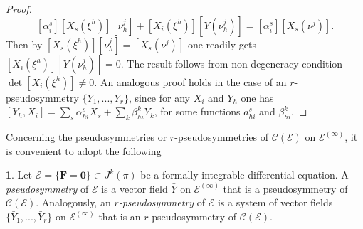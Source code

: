 \documentclass[12pt,english]{elsarticle}
\theoremstyle{plain}
\theoremstyle{plain}
\theoremstyle{remark}
\theoremstyle{plain}
\theoremstyle{definition}
\newtheorem{defn}[thm]{\protect\definitionname}
\theoremstyle{definition}
\providecommand{\definitionname}{Definition}
\begin{document}
\begin{proof}
\begin{equation*}
\left [\alpha _{i}^{s}\right ]\left [X_{s}(\xi ^{h})\right ]\left [
\nu _{h}^{j}\right ]+\left [X_{i}(\xi ^{h})\right ]\left [Y(\nu _{h}^{j})
\right ]=\left [\alpha _{i}^{s}\right ]\left [X_{s}(\nu ^{j})\right ].
\end{equation*}
%
Then by
$\left [X_{s}(\xi ^{h})\right ]\left [\nu _{h}^{j}\right ]=\left [X_{s}(
\nu ^{j})\right ]$ one readily gets
$\left [X_{i}(\xi ^{h})\right ]\left [Y(\nu _{h}^{j})\right ]=0$. The result
follows from non-degeneracy condition
$\det \left [X_{i}(\xi ^{h})\right ]\neq 0$. An analogous proof holds in
the case of an $r$-pseudosymmetry $\{Y_{1},...,Y_{r}\}$, since for any
$X_{i}$ and $Y_{h}$ one has
$[Y_{h},X_{i}]=\sum _{s}\alpha _{hi}^{s}X_{s}+\sum _{k}\beta _{hi}^{k}Y_{k}$,
for some functions $a_{hi}^{s}$ and $\beta _{hi}^{k}$.
\end{proof}
%


Concerning the pseudosymmetries or $r$-pseudosymmetries of
$\mathcal{\mathcal{C}}(\mathcal{E})$ on $\mathcal{E}^{(\infty )}$, it is
convenient to adopt the following
%
\begin{defn}
\label{defn10}
Let $\mathcal{E}=\{\mathbf{F=0}\}\subset J^{k}(\pi )$ be a formally integrable
differential equation. A \textit{pseudosymmetry} of $\mathcal{E}$ is a vector
field $\bar{Y}$ on $\mathcal{E}^{(\infty )}$ that is a pseudosymmetry of
$\mathcal{C}(\mathcal{E})$. Analogously, an \textit{$r$-pseudosymmetry}
of $\mathcal{E}$ is a system of vector fields
$\{\bar{Y}_{1},...,\bar{Y}_{r}\}$ on $\mathcal{E}^{(\infty )}$ that is
an $r$-pseudosymmetry of $\mathcal{C}(\mathcal{E})$.
\end{defn}
\end{document}

